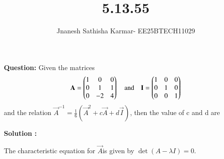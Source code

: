 \documentclass[journal]{IEEEtran}
\theoremstyle{remark}
\begin{document}
\setlength{\abovedisplayskip}{0pt}
\setlength{\belowdisplayskip}{0pt}
\setlength{\abovedisplayshortskip}{0pt}
\setlength{\belowdisplayshortskip}{0pt}

\onecolumn

\title{5.13.55}
\author{Jnanesh Sathisha Karmar- EE25BTECH11029}
\maketitle
\renewcommand{\thefigure}{\theenumi}
\renewcommand{\thetable}{\theenumi}
\noindent
\textbf{Question:} Given the matrices
\begin{align}
\mathbf{A} = \begin{pmatrix} 1 & 0 & 0 \\ 0 & 1 & 1 \\ 0 & -2 & 4 \end{pmatrix}
\quad \text{and} \quad
\mathbf{I} = \begin{pmatrix} 1 & 0 & 0 \\ 0 & 1 & 0 \\ 0 & 0 & 1 \end{pmatrix}
\end{align}
and the relation $\vec{A}^{-1} = \frac{1}{6}(\vec{A}^2 + c\vec{A} + d\vec{I})$, then the value of c and d are
\vspace{1em}

\noindent
\textbf{Solution :}

The characteristic equation for $\vec{A}$is given by $\det(A - \lambda I) = 0$.
\end{document}
